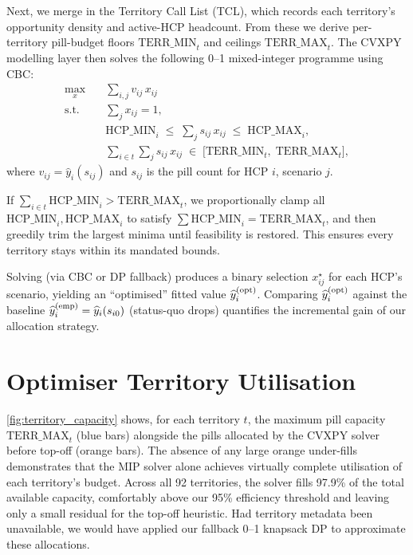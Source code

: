 Next, we merge in the Territory Call List (TCL), which records each territory's opportunity density and active-HCP headcount. From these we derive per-territory pill-budget floors \(\mathrm{TERR\_MIN}_t\) and ceilings \(\mathrm{TERR\_MAX}_t\). The CVXPY modelling layer then solves the following 0--1 mixed-integer programme using CBC:
\[
\begin{aligned}
\max_{x}\quad & \sum_{i,j} v_{ij}\,x_{ij} \\
\text{s.t.}\quad
& \sum_{j} x_{ij} = 1, \\
& \mathrm{HCP\_MIN}_i \;\le\; \sum_{j} s_{ij}\,x_{ij} \;\le\; \mathrm{HCP\_MAX}_i, \\
& \sum_{i\in t}\sum_{j} s_{ij}\,x_{ij}
  \;\in\;\bigl[\mathrm{TERR\_MIN}_t,\;\mathrm{TERR\_MAX}_t\bigr],
\end{aligned}
\]
where \(v_{ij}=\widehat y_i(s_{ij})\) and \(s_{ij}\) is the pill count for HCP \(i\), scenario \(j\).

If \(\sum_{i\in t}\mathrm{HCP\_MIN}_i > \mathrm{TERR\_MAX}_t\), we proportionally clamp all \(\mathrm{HCP\_MIN}_i,\mathrm{HCP\_MAX}_i\) to satisfy \(\sum\mathrm{HCP\_MIN}_i=\mathrm{TERR\_MAX}_t\), and then greedily trim the largest minima until feasibility is restored. This ensures every territory stays within its mandated bounds.

Solving (via CBC or DP fallback) produces a binary selection \(x_{ij}^\star\) for each HCP's scenario, yielding an ``optimised'' fitted value \(\widehat y_i^{(\rm opt)}\). Comparing \(\widehat y_i^{(\rm opt)}\) against the baseline \(\widehat y_i^{(\rm emp)}=\widehat y_i(s_{i0})\) (status-quo drops) quantifies the incremental gain of our allocation strategy.

\section{Optimiser Territory Utilisation}
\cref{fig:territory_capacity} shows, for each territory \(t\), the maximum pill capacity \(\mathrm{TERR\_MAX}_t\) (blue bars) alongside the pills allocated by the CVXPY solver before top-off (orange bars). The absence of any large orange under-fills demonstrates that the MIP solver alone achieves virtually complete utilisation of each territory's budget. Across all 92 territories, the solver fills 97.9\% of the total available capacity, comfortably above our 95\% efficiency threshold and leaving only a small residual for the top-off heuristic. Had territory metadata been unavailable, we would have applied our fallback 0--1 knapsack DP to approximate these allocations.

